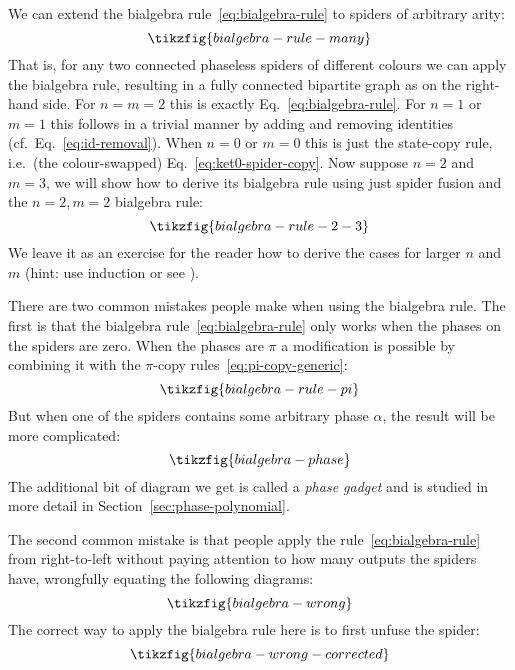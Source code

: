 \documentclass[a4paper,onecolumn,superscriptaddress,11pt,%
				unpublished,%
				allowfontchageintitle,%
				]{quantumarticle}
\begin{document}
We can extend the bialgebra rule~\eqref{eq:bialgebra-rule} to spiders of arbitrary arity:
\begin{equation}\label{eq:bialgebra-rule-many}
\tikzfig{bialgebra-rule-many}
\end{equation}
That is, for any two connected phaseless spiders of different colours we can apply the bialgebra rule, resulting in a fully connected bipartite graph as on the right-hand side.
For $n=m=2$ this is exactly Eq.~\eqref{eq:bialgebra-rule}. For $n=1$ or $m=1$ this follows in a trivial manner by adding and removing identities (cf.~Eq.~\eqref{eq:id-removal}).
When $n=0$ or $m=0$ this is just the state-copy rule, i.e.~(the colour-swapped) Eq.~\eqref{eq:ket0-spider-copy}.
Now suppose $n=2$ and $m=3$, we will show how to derive its bialgebra rule using just spider fusion and the $n=2,m=2$ bialgebra rule:
\begin{equation}
\tikzfig{bialgebra-rule-2-3}
\end{equation}
We leave it as an exercise for the reader how to derive the cases for larger $n$ and $m$ (hint: use induction or see \cite[Theorem~9.71]{CKbook}).

There are two common mistakes people make when using the bialgebra rule.
The first is that the bialgebra rule~\eqref{eq:bialgebra-rule} only works when the phases on the spiders are zero. When the phases are $\pi$ a modification is possible by combining it with the $\pi$-copy rules~\eqref{eq:pi-copy-generic}:
\begin{equation}
	\tikzfig{bialgebra-rule-pi}
\end{equation}
But when one of the spiders contains some arbitrary phase $\alpha$, the result will be more complicated:
\begin{equation}
	\tikzfig{bialgebra-phase}
\end{equation}
The additional bit of diagram we get is called a \emph{phase gadget} and is studied in more detail in Section~\ref{sec:phase-polynomial}.

The second common mistake is that people apply the rule~\eqref{eq:bialgebra-rule} from right-to-left without paying attention to how many outputs the spiders have, wrongfully equating the following diagrams:
\begin{equation}
	\tikzfig{bialgebra-wrong}
\end{equation}
The correct way to apply the bialgebra rule here is to first unfuse the spider:
\begin{equation}
	\tikzfig{bialgebra-wrong-corrected}
\end{equation}
\end{document}
